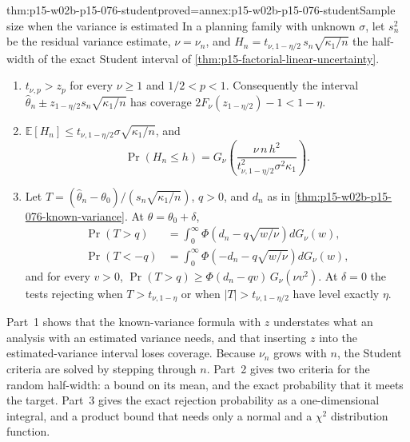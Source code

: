 \begin{hbtheorem}{thm:p15-w02b-p15-076-student}{proved=annex:p15-w02b-p15-076-student}{Sample size when the variance is estimated}
In a planning family with unknown \(\sigma\), let \(s_n^2\) be the
residual variance estimate, \(\nu=\nu_n\), and
\(H_n=t_{\nu,1-\eta/2}\,s_n\sqrt{\kappa_1/n}\) the half-width of the
exact Student interval of \cref{thm:p15-factorial-linear-uncertainty}.
\begin{enumerate}
\item \(t_{\nu,p}>z_p\) for every \(\nu\geq1\) and \(1/2<p<1\).
      Consequently the interval \(\widehat\theta_n\pm z_{1-\eta/2}s_n\sqrt{\kappa_1/n}\)
      has coverage \(2F_\nu(z_{1-\eta/2})-1<1-\eta\).
\item \(\mathbb E[H_n]\leq t_{\nu,1-\eta/2}\sigma\sqrt{\kappa_1/n}\), and
      \[
       \Pr(H_n\leq h)=G_\nu\!\left(\frac{\nu\,n\,h^2}
           {t_{\nu,1-\eta/2}^2\sigma^2\kappa_1}\right).
      \]
\item Let \(T=(\widehat\theta_n-\theta_0)/(s_n\sqrt{\kappa_1/n})\),
      \(q>0\), and \(d_n\) as in \cref{thm:p15-w02b-p15-076-known-variance}.
      At \(\theta=\theta_0+\delta\),
      \[
       \begin{aligned}
       \Pr(T>q)&=\int_0^\infty\Phi\!\left(d_n-q\sqrt{w/\nu}\right)dG_\nu(w),\\
       \Pr(T<-q)&=\int_0^\infty\Phi\!\left(-d_n-q\sqrt{w/\nu}\right)dG_\nu(w),
       \end{aligned}
      \]
      and for every \(v>0\),
      \(\Pr(T>q)\geq\Phi(d_n-qv)\,G_\nu(\nu v^2)\). At \(\delta=0\) the
      tests rejecting when \(T>t_{\nu,1-\eta}\) or when
      \(|T|>t_{\nu,1-\eta/2}\) have level exactly \(\eta\).
\end{enumerate}
\end{hbtheorem}

Part~1 shows that the known-variance formula with \(z\) understates what an
analysis with an estimated variance needs, and that inserting \(z\) into
the estimated-variance interval loses coverage. Because \(\nu_n\) grows
with \(n\), the Student criteria are solved by stepping through \(n\).
Part~2 gives two criteria for the random half-width: a bound on its mean,
and the exact probability that it meets the target. Part~3 gives the
exact rejection probability as a one-dimensional integral, and a product
bound that needs only a normal and a \(\chi^2\) distribution function.

